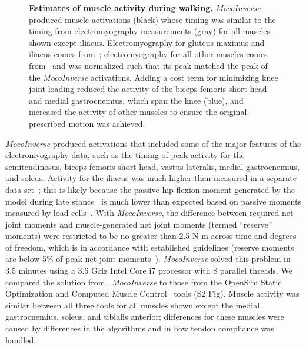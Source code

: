 \documentclass[10pt,letterpaper]{article}
\begin{document}
\begin{figure}[!h]
    \centering
    \caption{{\bf Estimates of muscle activity during walking.}
        \textit{MocoInverse} produced muscle activations (black) whose timing was similar to the timing from electromyography measurements (gray) for all muscles shown except iliacus. Electromyography for gluteus maximus and iliacus comes from~\cite{Perry:2010}; electromyography for all other muscles comes from~\cite{Rajagopal:2016ek} and was normalized such that its peak matched the peak of the \textit{MocoInverse} activations. Adding a cost term for minimizing knee joint loading reduced the activity of the biceps femoris short head and medial gastrocnemius, which span the knee (blue), and increased the activity of other muscles to ensure the original prescribed motion was achieved.
    }
    \label{walking}
\end{figure}

\textit{MocoInverse} produced activations that included some of the major features of the electromyography data, such as the timing of peak activity for the semitendinosus, biceps femoris short head, vastus lateralis, medial gastrocnemius, and soleus. Activity for the iliacus was much higher than measured in a separate data set~\cite{Perry:2010}; this is likely because the passive hip flexion moment generated by the model during late stance~\cite{Rajagopal:2016ek} is much lower than expected based on passive moments measured by load cells~\cite{Whittington:2008jia}. With \textit{MocoInverse}, the difference between required net joint moments and muscle-generated net joint moments (termed ``reserve'' moments) were restricted to be no greater than 2.5 N-m across time and degrees of freedom, which is in accordance with established guidelines (reserve moments are below 5\% of peak net joint moments~\cite{Hicks:2015bo}). \textit{MocoInverse} solved this problem in 3.5 minutes using a 3.6 GHz Intel Core i7 processor with 8 parallel threads. We compared the solution from ~\textit{MocoInverse} to those from the OpenSim Static Optimization and Computed Muscle Control~\cite{Thelen:2003bba} tools (S2 Fig). Muscle activity was similar between all three tools for all muscles shown except the medial gastrocnemius, soleus, and tibialis anterior; differences for these muscles were caused by differences in the algorithms and in how tendon compliance was handled.
\end{document}
